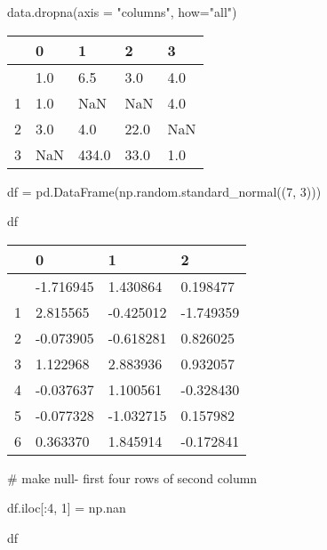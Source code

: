 \documentclass[
  letterpaper,
  DIV=11,
  numbers=noendperiod]{scrreprt}
\newenvironment{Shaded}{\begin{snugshade}}{\end{snugshade}}
\newcommand{\CommentTok}[1]{\textcolor[rgb]{0.37,0.37,0.37}{#1}}
\newcommand{\DecValTok}[1]{\textcolor[rgb]{0.68,0.00,0.00}{#1}}
\newcommand{\NormalTok}[1]{\textcolor[rgb]{0.00,0.23,0.31}{#1}}
\newcommand{\OperatorTok}[1]{\textcolor[rgb]{0.37,0.37,0.37}{#1}}
\newcommand{\StringTok}[1]{\textcolor[rgb]{0.13,0.47,0.30}{#1}}
\begin{document}
\begin{Shaded}
\begin{Highlighting}[]
\NormalTok{data.dropna(axis }\OperatorTok{=} \StringTok{"columns"}\NormalTok{, how}\OperatorTok{=}\StringTok{"all"}\NormalTok{)}
\end{Highlighting}
\end{Shaded}

\begin{longtable}[]{@{}lllll@{}}
\toprule\noalign{}
& 0 & 1 & 2 & 3 \\
\midrule\noalign{}
\endhead
\bottomrule\noalign{}
\endlastfoot
0 & 1.0 & 6.5 & 3.0 & 4.0 \\
1 & 1.0 & NaN & NaN & 4.0 \\
2 & 3.0 & 4.0 & 22.0 & NaN \\
3 & NaN & 434.0 & 33.0 & 1.0 \\
\end{longtable}

\begin{Shaded}
\begin{Highlighting}[]
\NormalTok{df }\OperatorTok{=}\NormalTok{ pd.DataFrame(np.random.standard\_normal((}\DecValTok{7}\NormalTok{, }\DecValTok{3}\NormalTok{)))}

\NormalTok{df}
\end{Highlighting}
\end{Shaded}

\begin{longtable}[]{@{}llll@{}}
\toprule\noalign{}
& 0 & 1 & 2 \\
\midrule\noalign{}
\endhead
\bottomrule\noalign{}
\endlastfoot
0 & -1.716945 & 1.430864 & 0.198477 \\
1 & 2.815565 & -0.425012 & -1.749359 \\
2 & -0.073905 & -0.618281 & 0.826025 \\
3 & 1.122968 & 2.883936 & 0.932057 \\
4 & -0.037637 & 1.100561 & -0.328430 \\
5 & -0.077328 & -1.032715 & 0.157982 \\
6 & 0.363370 & 1.845914 & -0.172841 \\
\end{longtable}

\begin{Shaded}
\begin{Highlighting}[]
\CommentTok{\# make null{-} first four rows of second column}

\NormalTok{df.iloc[:}\DecValTok{4}\NormalTok{, }\DecValTok{1}\NormalTok{] }\OperatorTok{=}\NormalTok{ np.nan}

\NormalTok{df}
\end{Highlighting}
\end{Shaded}
\end{document}
